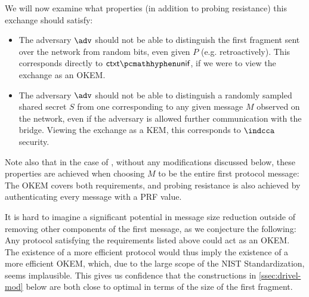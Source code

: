 We will now examine what properties (in addition to probing resistance) this exchange should satisfy:
\begin{itemize}
    \item The adversary $\adv$ should not be able to distinguish the first fragment sent over the network from random bits, even given $P$ (e.g. retroactively). This corresponds directly to $\ctxtunif$, if we were to view the exchange as an OKEM.

    \item The adversary $\adv$ should not be able to distinguish a randomly sampled shared secret $S$ from one corresponding to any given message $M$ observed on the network, even if the adversary is allowed further communication with the bridge. Viewing the exchange as a KEM, this corresponds to $\indcca$ security.
    
\end{itemize}

Note also that in the case of \drivel{}, without any modifications discussed below, these properties are achieved when choosing $M$ to be the entire first protocol message:
The OKEM covers both requirements, and probing resistance is also achieved by authenticating every message with a PRF value.

It is hard to imagine a significant potential in message size reduction outside of removing other components of the first \drivel{} message, as we conjecture the following:
Any protocol satisfying the requirements listed above could act as an OKEM.
The existence of a more efficient protocol would thus imply the existence of a more efficient OKEM, which, due to the large scope of the NIST Standardization, seems implausible.
This gives us confidence that the constructions in \cref{ssec:drivel-mod} below are both close to optimal in terms of the size of the first fragment.

